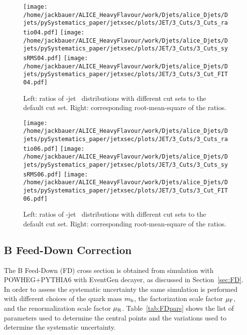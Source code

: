 \begin{figure}[bth]
\begin{center}
\texttt{[image: /home/jackbauer/ALICE\_HeavyFlavour/work/Djets/alice\_Djets/Djets/pySystematics\_paper/jetxsec/plots/JET/3\_Cuts/3\_Cuts\_ratio04.pdf]}
\texttt{[image: /home/jackbauer/ALICE\_HeavyFlavour/work/Djets/alice\_Djets/Djets/pySystematics\_paper/jetxsec/plots/JET/3\_Cuts/3\_Cuts\_sysRMS04.pdf]}
\texttt{[image: /home/jackbauer/ALICE\_HeavyFlavour/work/Djets/alice\_Djets/Djets/pySystematics\_paper/jetxsec/plots/JET/3\_Cuts/3\_Cut\_FIT04.pdf]}
\caption{Left: ratios of \Dzero-jet \pt\ distributions with different cut sets to the default cut set. Right: corresponding root-mean-square of the ratios.} 
\label{fig:JetPtCutSys_DzeroR04}
\end{center}
\end{figure}

\begin{figure}[bth]
\begin{center}
\texttt{[image: /home/jackbauer/ALICE\_HeavyFlavour/work/Djets/alice\_Djets/Djets/pySystematics\_paper/jetxsec/plots/JET/3\_Cuts/3\_Cuts\_ratio06.pdf]}
\texttt{[image: /home/jackbauer/ALICE\_HeavyFlavour/work/Djets/alice\_Djets/Djets/pySystematics\_paper/jetxsec/plots/JET/3\_Cuts/3\_Cuts\_sysRMS06.pdf]}
\texttt{[image: /home/jackbauer/ALICE\_HeavyFlavour/work/Djets/alice\_Djets/Djets/pySystematics\_paper/jetxsec/plots/JET/3\_Cuts/3\_Cut\_FIT06.pdf]}
\caption{Left: ratios of \Dzero-jet \pt\ distributions with different cut sets to the default cut set. Right: corresponding root-mean-square of the ratios.} 
\label{fig:JetPtCutSys_DzeroR06}
\end{center}
\end{figure}
\subsection{B Feed-Down Correction}\label{subsec:bfeedsys}

The B Feed-Down (FD) cross section is obtained from simulation with POWHEG+PYTHIA6 with EventGen decayer, as discussed in Section~\ref{sec:FD}.
In order to assess the systematic uncertainty the same simulation is performed with different choices of the quark mass $m_{\rm b}$, the factorization scale factor $\mu_{\rm F}$, and the renormalization scale factor $\mu_{\rm R}$.
Table~\ref{tab:FDpars} shows the list of parameters used to determine the central points and the variations used to determine the systematic uncertainty.

